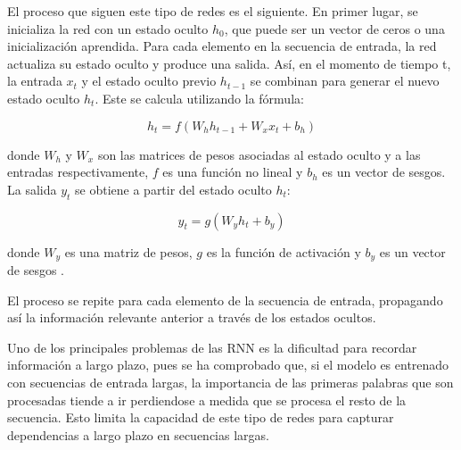 \documentclass[11pt,spanish,listoffigures,listoftables]{tfgetsinf}
\begin{document}
El proceso que siguen este tipo de redes es el siguiente. En primer lugar, se inicializa la red con un estado oculto $h_0$, que puede ser un vector de ceros o una inicialización aprendida. Para cada elemento en la secuencia de entrada, la red actualiza su estado oculto y produce una salida. Así, en el momento de tiempo t, la entrada $x_t$ y el estado oculto previo $h_{t-1}$ se combinan para generar el nuevo estado oculto $h_t$. Este se calcula utilizando la fórmula:

\begin{equation}
h_t = f(W_hh_{t-1} + W_xx_t + b_h)
\end{equation}

donde $W_h$ y $W_x$ son las matrices de pesos asociadas al estado oculto y a las entradas respectivamente, $f$ es una función no lineal y $b_h$ es un vector de sesgos. La salida $y_t$ se obtiene a partir del estado oculto $h_t$:

\begin{equation}
y_t = g(W_yh_t + b_y)
\end{equation}

donde $W_y$ es una matriz de pesos, $g$ es la función de activación y $b_y$ es un vector de sesgos \cite{sutskever2014sequencesequencelearningneural}.

El proceso se repite para cada elemento de la secuencia de entrada, propagando así la información relevante anterior a través de los estados ocultos.

Uno de los principales problemas de las RNN es la dificultad para recordar información a largo plazo, pues se ha comprobado que, si el modelo es entrenado con secuencias de entrada largas, la importancia de las primeras palabras que son procesadas tiende a ir perdiendose a medida que se procesa el resto de la secuencia. Esto limita la capacidad de este tipo de redes para capturar dependencias a largo plazo en secuencias largas.

\end{document}
